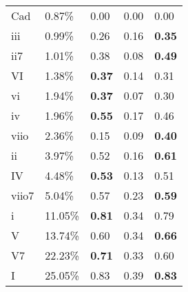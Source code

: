 \begin{tabular}{lllll}
Cad   & 0.87\%                 & 0.00                 & 0.00                        & 0.00           \\
iii   & 0.99\%                 & 0.26                 & 0.16                        & \textbf{0.35}  \\
ii7   & 1.01\%                 & 0.38                 & 0.08                        & \textbf{0.49}  \\
VI    & 1.38\%                 & \textbf{0.37}        & 0.14                        & 0.31           \\
vi    & 1.94\%                 & \textbf{0.37}        & 0.07                        & 0.30           \\
iv    & 1.96\%                 & \textbf{0.55}        & 0.17                        & 0.46           \\
viio  & 2.36\%                 & 0.15                 & 0.09                        & \textbf{0.40}  \\
ii    & 3.97\%                 & 0.52                 & 0.16                        & \textbf{0.61}  \\
IV    & 4.48\%                 & \textbf{0.53}        & 0.13                        & 0.51           \\
viio7 & 5.04\%                 & 0.57                 & 0.23                        & \textbf{0.59}  \\
i     & 11.05\%                & \textbf{0.81}        & 0.34                        & 0.79           \\
V     & 13.74\%                & 0.60                 & 0.34                        & \textbf{0.66}  \\
V7    & 22.23\%                & \textbf{0.71}        & 0.33                        & 0.60           \\
I     & 25.05\%                & 0.83                 & 0.39                        & \textbf{0.83}     
\end{tabular}
